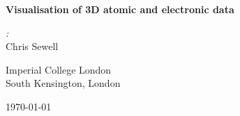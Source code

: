 \documentclass[10pt,parskip=half,
	toc=sectionentrywithdots,
	bibliography=totocnumbered,
	captions=tableheading,numbers=noendperiod]{scrartcl}
\begin{document}
		\begin{titlepage}

	\begin{center}

	\vspace*{1cm}

	\Huge\textbf{Visualisation of 3D atomic and electronic data}

	\vspace{0.5cm}

	\vspace{1.5cm}

	\begin{minipage}{0.8\textwidth}   
		\begin{center}  
		\begin{minipage}{0.39\textwidth}
		\begin{flushleft} \Large
		\emph{:}\\Chris Sewell\\
		\end{flushleft}
		\end{minipage}
		\hspace{\fill}
		\begin{minipage}{0.39\textwidth}
		\begin{flushright} \Large
		\end{flushright}
		\end{minipage}
		\end{center}   
	\end{minipage}

	\vfill

	\begin{minipage}{0.8\textwidth}
	\begin{center}
	\end{center} 
	\end{minipage}

	\vspace{0.8cm}
		  \LARGE{Imperial College London}\\
		  \LARGE{South Kensington, London}\\

	\vspace{0.4cm}

	\today

	\end{center}
	\end{titlepage}

		\begingroup
    \let\cleardoublepage\relax
    \let\clearpage\relax\tableofcontents\listoffigures\listoftables
    \endgroup
\end{document}
